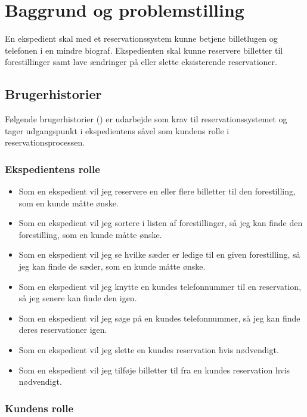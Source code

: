 \chapter{Baggrund og problemstilling}

En ekspedient skal med et reservationssystem kunne betjene billetlugen og telefonen i en mindre biograf. Ekspedienten skal kunne reservere billetter til forestillinger samt lave ændringer på eller slette eksisterende reservationer.

\section{Brugerhistorier}

Følgende brugerhistorier (\cite{wiki:user-story}) er udarbejde som krav til reservationssystemet og tager udgangspunkt i ekspedientens såvel som kundens rolle i reservationsprocessen.

\subsection{Ekspedientens rolle}

\begin{itemize}
  \item Som en ekspedient vil jeg reservere en eller flere billetter til den forestilling, som en kunde måtte ønske.
  \item Som en ekspedient vil jeg sortere i listen af forestillinger, så jeg kan finde den forestilling, som en kunde måtte ønske.
  \item Som en ekspedient vil jeg se hvilke sæder er ledige til en given forestilling, så jeg kan finde de sæder, som en kunde måtte ønske.
  \item Som en ekspedient vil jeg knytte en kundes telefonnummer til en reservation, så jeg senere kan finde den igen.
  \item Som en ekspedient vil jeg søge på en kundes telefonnummer, så jeg kan finde deres reservationer igen.
  \item Som en ekspedient vil jeg slette en kundes reservation hvis nødvendigt.
  \item Som en ekspedient vil jeg tilføje billetter til  fra en kundes reservation hvis nødvendigt.
\end{itemize}
  
\subsection{Kundens rolle}

